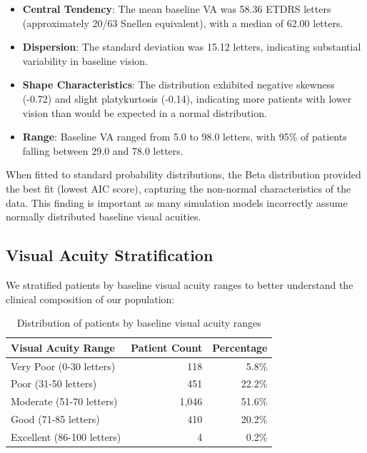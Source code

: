 \begin{itemize}
    \item \textbf{Central Tendency}: The mean baseline VA was 58.36 ETDRS letters (approximately 20/63 Snellen equivalent), with a median of 62.00 letters.
    \item \textbf{Dispersion}: The standard deviation was 15.12 letters, indicating substantial variability in baseline vision.
    \item \textbf{Shape Characteristics}: The distribution exhibited negative skewness (-0.72) and slight platykurtosis (-0.14), indicating more patients with lower vision than would be expected in a normal distribution.
    \item \textbf{Range}: Baseline VA ranged from 5.0 to 98.0 letters, with 95\% of patients falling between 29.0 and 78.0 letters.
\end{itemize}

When fitted to standard probability distributions, the Beta distribution provided the best fit (lowest AIC score), capturing the non-normal characteristics of the data. This finding is important as many simulation models incorrectly assume normally distributed baseline visual acuities.

\subsection{Visual Acuity Stratification}

We stratified patients by baseline visual acuity ranges to better understand the clinical composition of our population:

\begin{table}[h]
\centering
\caption{Distribution of patients by baseline visual acuity ranges}
\label{tab:va_stratification}
\begin{tabular}{lrr}
\hline
\textbf{Visual Acuity Range} & \textbf{Patient Count} & \textbf{Percentage} \\
\hline
Very Poor (0-30 letters) & 118 & 5.8\% \\
Poor (31-50 letters) & 451 & 22.2\% \\
Moderate (51-70 letters) & 1,046 & 51.6\% \\
Good (71-85 letters) & 410 & 20.2\% \\
Excellent (86-100 letters) & 4 & 0.2\% \\
\hline
\end{tabular}
\end{table}

